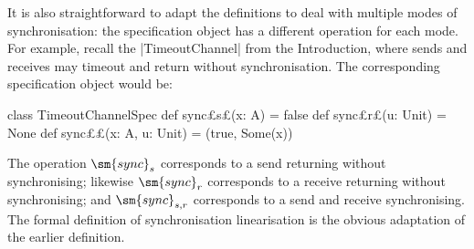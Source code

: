 It is also straightforward to adapt the definitions to deal with multiple
modes of synchronisation: the specification object has a different operation
for each mode.  For example, recall the |TimeoutChannel| from the
Introduction, where sends and receives may timeout and return without
synchronisation.  The corresponding specification object would be:
%
\begin{scala}
class TimeoutChannelSpec{
  def sync£\s s£(x: A) = false
  def sync£\s r£(u: Unit) = None
  def sync££(x: A, u: Unit) = (true, Some(x))
}
\end{scala}
%
The operation $\sm{sync}_s$ corresponds to a send returning without
synchronising; likewise $\sm{sync}_r$ corresponds to a receive returning
without synchronising; and $\sm{sync}_{s,r}$ corresponds to a send and receive
synchronising.  The formal definition of synchronisation linearisation is the
obvious adaptation of the earlier definition.
